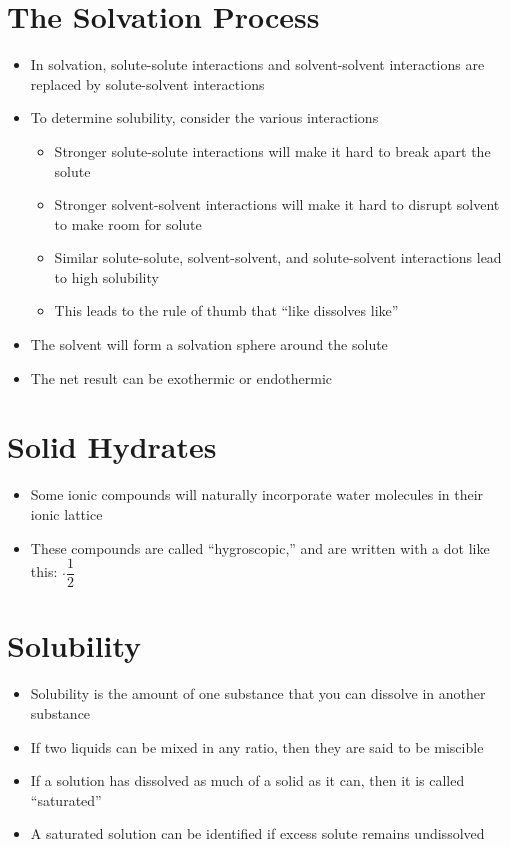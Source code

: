 \documentclass[12pt, openany, letterpaper]{memoir}
\begin{document}
\section{The Solvation Process}
\begin{itemize}
	\item In solvation, solute-solute interactions and solvent-solvent interactions are replaced by solute-solvent interactions
	\item To determine solubility, consider the various interactions
	\begin{itemize}
		\item Stronger solute-solute interactions will make it hard to break apart the solute
		\item Stronger solvent-solvent interactions will make it hard to disrupt solvent to make room for solute
		\item Similar solute-solute, solvent-solvent, and solute-solvent interactions lead to high solubility
		\item This leads to the rule of thumb that ``like dissolves like''
	\end{itemize}
	\item The solvent will form a solvation sphere around the solute
	\item The net result can be exothermic or endothermic
\end{itemize}
\section{Solid Hydrates}
\begin{itemize}
	\item Some ionic compounds will naturally incorporate water molecules in their ionic lattice
	\item These compounds are called ``hygroscopic,'' and are written with a dot like this: $\cdot \dfrac{1}{2}$ 
\end{itemize}
\section{Solubility}
\begin{itemize}
	\item Solubility is the amount of one substance that you can dissolve in another substance
	\item If two liquids can be mixed in any ratio, then they are said to be miscible
	\item If a solution has dissolved as much of a solid as it can, then it is called ``saturated''
	\item A saturated solution can be identified if excess solute remains undissolved 
\end{itemize}
\end{document}
